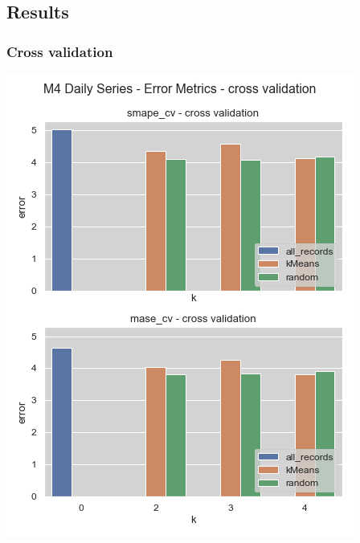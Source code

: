 \documentclass[11pt]{article}
\begin{document}
\subsection*{Results}
\label{sec:orgefcf33b}
\subsubsection*{Cross validation}
\label{sec:org9ecaa74}
\begin{center}
\includegraphics[width=.9\linewidth]{../img/daily_cv_results.png}
\end{center}
\end{document}
